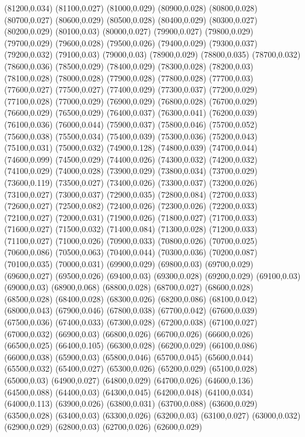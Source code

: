 (81200,0.034)
(81100,0.027)
(81000,0.029)
(80900,0.028)
(80800,0.028)
(80700,0.027)
(80600,0.029)
(80500,0.028)
(80400,0.029)
(80300,0.027)
(80200,0.029)
(80100,0.03)
(80000,0.027)
(79900,0.027)
(79800,0.029)
(79700,0.029)
(79600,0.028)
(79500,0.026)
(79400,0.029)
(79300,0.037)
(79200,0.032)
(79100,0.03)
(79000,0.03)
(78900,0.029)
(78800,0.035)
(78700,0.032)
(78600,0.036)
(78500,0.029)
(78400,0.029)
(78300,0.028)
(78200,0.03)
(78100,0.028)
(78000,0.028)
(77900,0.028)
(77800,0.028)
(77700,0.03)
(77600,0.027)
(77500,0.027)
(77400,0.029)
(77300,0.037)
(77200,0.029)
(77100,0.028)
(77000,0.029)
(76900,0.029)
(76800,0.028)
(76700,0.029)
(76600,0.029)
(76500,0.029)
(76400,0.037)
(76300,0.041)
(76200,0.039)
(76100,0.036)
(76000,0.044)
(75900,0.037)
(75800,0.046)
(75700,0.052)
(75600,0.038)
(75500,0.034)
(75400,0.039)
(75300,0.036)
(75200,0.043)
(75100,0.031)
(75000,0.032)
(74900,0.128)
(74800,0.039)
(74700,0.044)
(74600,0.099)
(74500,0.029)
(74400,0.026)
(74300,0.032)
(74200,0.032)
(74100,0.029)
(74000,0.028)
(73900,0.029)
(73800,0.034)
(73700,0.029)
(73600,0.119)
(73500,0.027)
(73400,0.026)
(73300,0.037)
(73200,0.026)
(73100,0.027)
(73000,0.037)
(72900,0.035)
(72800,0.084)
(72700,0.033)
(72600,0.027)
(72500,0.082)
(72400,0.026)
(72300,0.026)
(72200,0.033)
(72100,0.027)
(72000,0.031)
(71900,0.026)
(71800,0.027)
(71700,0.033)
(71600,0.027)
(71500,0.032)
(71400,0.084)
(71300,0.028)
(71200,0.033)
(71100,0.027)
(71000,0.026)
(70900,0.033)
(70800,0.026)
(70700,0.025)
(70600,0.086)
(70500,0.063)
(70400,0.044)
(70300,0.036)
(70200,0.087)
(70100,0.035)
(70000,0.031)
(69900,0.029)
(69800,0.03)
(69700,0.029)
(69600,0.027)
(69500,0.026)
(69400,0.03)
(69300,0.028)
(69200,0.029)
(69100,0.03)
(69000,0.03)
(68900,0.068)
(68800,0.028)
(68700,0.027)
(68600,0.028)
(68500,0.028)
(68400,0.028)
(68300,0.026)
(68200,0.086)
(68100,0.042)
(68000,0.043)
(67900,0.046)
(67800,0.038)
(67700,0.042)
(67600,0.039)
(67500,0.036)
(67400,0.033)
(67300,0.028)
(67200,0.038)
(67100,0.027)
(67000,0.032)
(66900,0.03)
(66800,0.026)
(66700,0.026)
(66600,0.026)
(66500,0.025)
(66400,0.105)
(66300,0.028)
(66200,0.029)
(66100,0.086)
(66000,0.038)
(65900,0.03)
(65800,0.046)
(65700,0.045)
(65600,0.044)
(65500,0.032)
(65400,0.027)
(65300,0.026)
(65200,0.029)
(65100,0.028)
(65000,0.03)
(64900,0.027)
(64800,0.029)
(64700,0.026)
(64600,0.136)
(64500,0.088)
(64400,0.03)
(64300,0.045)
(64200,0.048)
(64100,0.034)
(64000,0.113)
(63900,0.026)
(63800,0.031)
(63700,0.088)
(63600,0.029)
(63500,0.028)
(63400,0.03)
(63300,0.026)
(63200,0.03)
(63100,0.027)
(63000,0.032)
(62900,0.029)
(62800,0.03)
(62700,0.026)
(62600,0.029)

